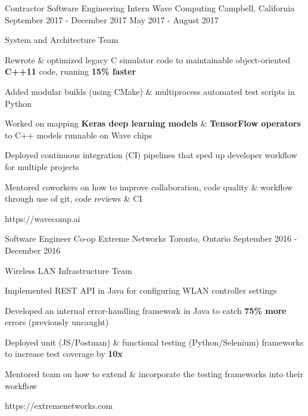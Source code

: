 


\begin{cventries}


\cventrylink
{Contractor \newline {\vspace{-.75mm}}
Software Engineering Intern}
{Wave Computing}
{Campbell, California}
{September 2017 - December 2017 \newline {\vspace{-1mm}}
May 2017 - August 2017}
{ %
System and Architecture Team
\begin{cvitems}
\item[]
\item {Rewrote \& optimized legacy C simulator code to maintainable object-oriented \textbf{C++11} code, running \textbf{15\% faster}}
\item {Added modular builds (using CMake) \& multiprocess automated test scripts in Python}
\item {Worked on mapping \textbf{Keras deep learning models} \& \textbf{TensorFlow operators} to C++ models runnable on Wave chips}
\item {Deployed continuous integration (CI) pipelines that sped up developer workflow for multiple projects }
\item {Mentored coworkers on how to improve collaboration, code quality \& workflow through use of git, code reviews \& CI}
\end{cvitems}
}
{https://wavecomp.ai}


\cventrylink
{Software Engineer Co-op}
{Extreme Networks}
{Toronto, Ontario}
{September 2016 - December 2016}
{ %
Wireless LAN Infrastructure Team
\begin{cvitems}
\item[]
\item {Implemented REST API in Java for configuring WLAN controller settings}
\item {Developed an internal error-handling framework in Java to catch \textbf{75\% more} errors (previously uncaught)}
\item {Deployed unit (JS/Postman) \& functional testing (Python/Selenium) frameworks to increase test coverage by \textbf{10x}}
\item {Mentored team on how to extend \& incorporate the testing frameworks into their workflow}
\end{cvitems}
}
{https://extremenetworks.com}


\end{cventries}
